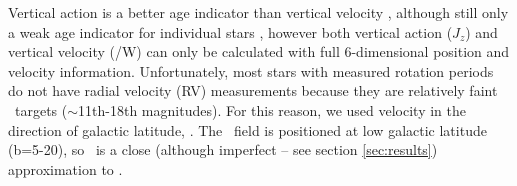 Vertical action is a better age indicator than vertical velocity
\citep{ting2019}, although still only a weak age indicator for individual
stars \citep{beane2018}, however both vertical action ($J_z$) and vertical
velocity (\vz/W) can only be calculated with full 6-dimensional position and
velocity information.
Unfortunately, most stars with measured rotation periods do not have radial
velocity (RV) measurements because they are relatively faint \kepler\ targets
($\sim$11th-18th magnitudes).
For this reason, we used velocity in the direction of galactic latitude, \vb.
The \kepler\ field is positioned at low galactic latitude (b=5-20\degrees), so
\vb\ is a close (although imperfect -- see section \ref{sec:results})
approximation to \vz.



